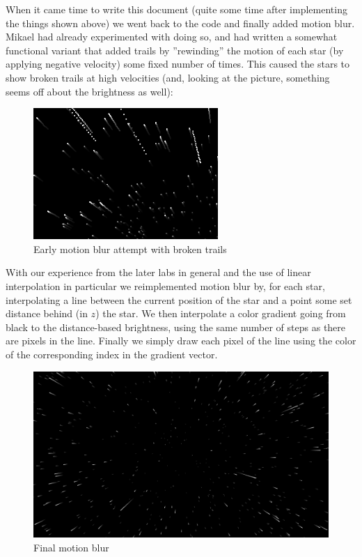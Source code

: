 \documentclass[a4paper,11pt]{article}
\begin{document}
\noindent
When it came time to write this document (quite some time after implementing the things shown above)
we went back to the code and finally added motion blur. Mikael had already experimented with
doing so, and had written a somewhat functional variant that added trails by
''rewinding'' the motion of each star (by applying negative velocity) some fixed number of times.
This caused the stars to show broken trails at high velocities (and, looking at the picture,
something seems off about the brightness as well):

\begin{figure}[H]
\begin{center}
\includegraphics[width=7cm]{lurblurtrails.png}
\caption{Early motion blur attempt with broken trails}
\end{center}
\end{figure}
\vspace{-0.5cm}

\noindent
With our experience from the later labs in general and the use of linear interpolation in
particular we reimplemented motion blur by, for each star, interpolating a line between the
current position of the star and a point some set distance behind (in $z$) the star. We then interpolate
a color gradient going from black to the distance-based brightness, using the same number of steps
as there are pixels in the line. Finally we simply draw each pixel of the line using the color
of the corresponding index in the gradient vector.

\begin{figure}[H]
\begin{center}
\includegraphics[width=12cm]{motionblur.png}
\caption{Final motion blur}
\end{center}
\end{figure}
\vspace{-0.5cm}
\end{document}
